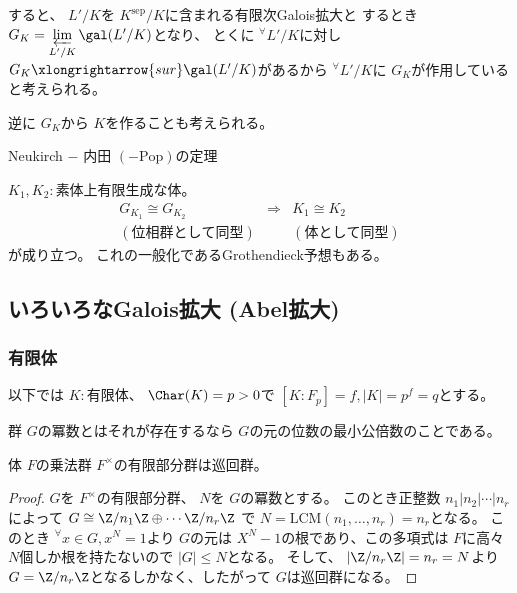 \documentclass[../master_galois_theory]{subfiles}
\begin{document}
すると、 $L'/K$を $K^{\mathrm{sep}}/K$に含まれる有限次\rm{Galois}拡大と
するとき $G_K = \mathop{\varprojlim}\limits_{L'/K} \gal(L'/K)$となり、
とくに ${}^\forall L'/K$に対し
$G_K \xlongrightarrow{sur} \gal(L'/K)$があるから
${}^\forall L'/K$に $G_K$が作用していると考えられる。

逆に $G_K$から $K$を作ることも考えられる。

\begin{theo}
  \rm{Neukirch} $-$ 内田 $(- \mathrm{Pop})$の定理

  $K_1 , K_2:$素体上有限生成な体。
  \begin{eqnarray*}
    G_{K_1} \cong G_{K_2} & \Rightarrow & K_1 \cong K_2 \\
    (位相群として同型) &  & (体として同型)
  \end{eqnarray*}
  が成り立つ。
  これの一般化である\rm{Grothendieck}予想もある。
\end{theo}

\subsection{いろいろなGalois拡大 (Abel拡大)}

\subsubsection{有限体}

以下では $K:$有限体、 $\Char(K) = p > 0$で
$[K:F_p] = f , |K| = p^f = q$とする。

\begin{defi} \label{defi:exponent}
  群 $G$の冪数とはそれが存在するなら $G$の元の位数の最小公倍数のことである。
\end{defi}

\begin{lemm} \label{lemm12.4}
  体 $F$の乗法群 $F^\times$の有限部分群は巡回群。
\end{lemm}

\begin{proof}
  $G$を $F^\times$の有限部分群、 $N$を $G$の冪数とする。
  このとき正整数 $n_1 | n_2 | \cdots | n_r$によって
  $G \cong \Z/n_1 \Z \oplus \cdots \Z/n_r \Z$
  で $N = \mathrm{LCM} (n_1 , \dots , n_r) = n_r$となる。
  このとき ${}^\forall x \in G , x^N = 1$より
  $G$の元は $X^N - 1$の根であり、この多項式は $F$に高々 $N$個しか根を持たないので
  $|G| \leq N$となる。
  そして、 $|\Z/n_r \Z| = n_r = N$より
  $G = \Z/n_r \Z$となるしかなく、したがって $G$は巡回群になる。
\end{proof}
\end{document}
